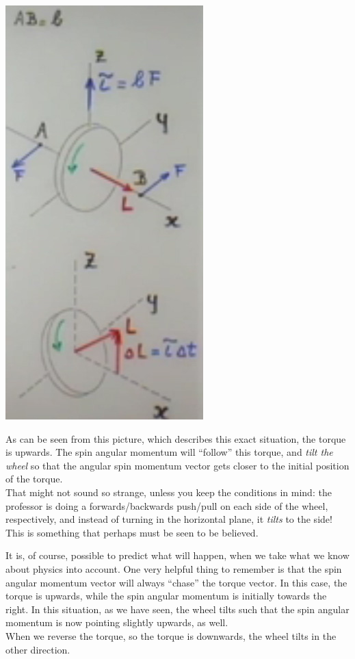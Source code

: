 \documentclass[8.01x]{subfiles}
\begin{document}
\begin{center}
\includegraphics[scale=0.65]{Graphics/lec24_wheel_directions}
\end{center}

As can be seen from this picture, which describes this exact situation, the torque is upwards. The spin angular momentum will ``follow'' this torque, and \emph{tilt the wheel} so that the angular spin momentum vector gets closer to the initial position of the torque.\\
That might not sound so strange, unless you keep the conditions in mind: the professor is doing a forwards/backwards push/pull on each side of the wheel, respectively, and instead of turning in the horizontal plane, it \emph{tilts} to the side! This is something that perhaps must be seen to be believed.

It is, of course, possible to predict what will happen, when we take what we know about physics into account. One very helpful thing to remember is that the spin angular momentum vector will always ``chase'' the torque vector. In this case, the torque is upwards, while the spin angular momentum is initially towards the right. In this situation, as we have seen, the wheel tilts such that the spin angular momentum is now pointing slightly upwards, as well.\\
When we reverse the torque, so the torque is downwards, the wheel tilts in the other direction.
\end{document}
